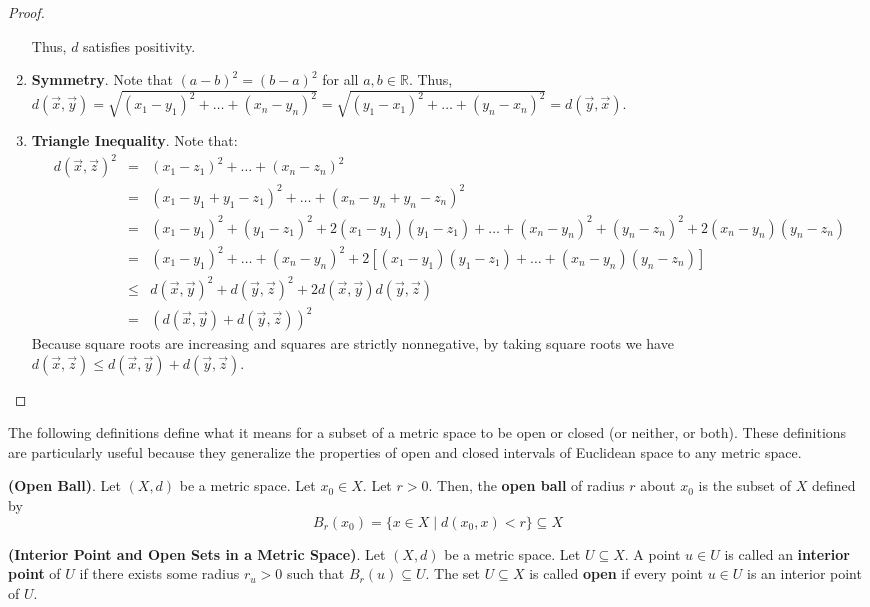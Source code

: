 \begin{proof}
\begin{enumerate}
        Thus, $d$ satisfies positivity.
        \item[] \textbf{Symmetry}. Note that $(a-b)^2=(b-a)^2$ for all $a,b\in\mathbb{R}$. Thus, $d(\vec{x},\vec{y}) = \sqrt{(x_1-y_1)^2+\dots+(x_n-y_n)^2} = \sqrt{(y_1-x_1)^2 + \dots + (y_n-x_n)^2} = d(\vec{y},\vec{x})$.
        \item[] \textbf{Triangle Inequality}. Note that: \begin{eqnarray*}
            d(\vec{x},\vec{z})^2 &=& (x_1-z_1)^2 + \dots + (x_n-z_n)^2\\
            &=& (x_1-y_1 + y_1 -z_1)^2 + \dots + (x_n - y_n + y_n -z_n)^2\\
            &=& (x_1-y_1)^2 + (y_1-z_1)^2 + 2(x_1-y_1)(y_1-z_1) + \dots + (x_n-y_n)^2 + (y_n-z_n)^2 + 2(x_n-y_n)(y_n-z_n)\\
            &=& (x_1-y_1)^2 + \dots + (x_n-y_n)^2 + 2\left[(x_1-y_1)(y_1-z_1) + \dots + (x_n-y_n)(y_n-z_n)\right]\\
            &\leq& d(\vec{x},\vec{y})^2 + d(\vec{y},\vec{z})^2 + 2d(\vec{x},\vec{y})d(\vec{y},\vec{z})\\
            &=& (d(\vec{x},\vec{y})+d(\vec{y},\vec{z}))^2
        \end{eqnarray*} Because square roots are increasing and squares are strictly nonnegative, by taking square roots we have $d(\vec{x},\vec{z})\leq d(\vec{x},\vec{y})+d(\vec{y},\vec{z})$.
    \end{enumerate}
\end{proof}

The following definitions define what it means for a subset of a metric space to be open or closed (or neither, or both). These definitions are particularly useful because they generalize the properties of open and closed intervals of Euclidean space to any metric space.
\begin{defn}
    \textbf{(Open Ball)}. Let $(X,d)$ be a metric space. Let $x_0\in X$. Let $r>0$. Then, the \textbf{open ball} of radius $r$ about $x_0$ is the subset of $X$ defined by \[B_r(x_0) = \{x\in X\mid d(x_0,x)<r\}\subseteq X\]
\end{defn}

\begin{defn}
    \textbf{(Interior Point and Open Sets in a Metric Space)}. Let $(X,d)$ be a metric space. Let $U\subseteq X$. A point $u\in U$ is called an \textbf{interior point} of $U$ if there exists some radius $r_u>0$ such that $B_r(u)\subseteq U$. The set $U\subseteq X$ is called \textbf{open} if every point $u\in U$ is an interior point of $U$.
\end{defn}

